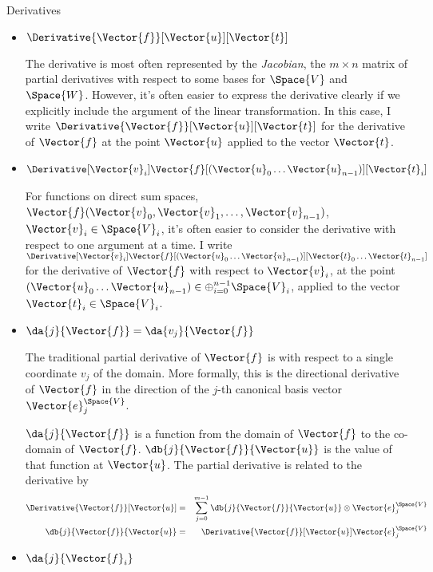 \begin{plSection}{Derivatives}
\begin{itemize}
\item $\Derivative{\Vector{f}}[\Vector{u}][\Vector{t}]$

The derivative is most often represented by the \textit{Jacobian},
the $m \times n$ matrix of partial derivatives
with respect to some bases for $\Space{V}$ and $\Space{W}$.
However, it's often easier to express the derivative clearly if we
explicitly include the argument of the linear transformation.
In this case, I write 
$\Derivative{\Vector{f}}[\Vector{u}][\Vector{t}]$
for the derivative of $\Vector{f}$ at the point $\Vector{u}$
applied to the vector $\Vector{t}$.

\item $\Derivative
[\Vector{v}_i]
{\Vector{f}}
[(\Vector{u}_0 \ldots \Vector{u}_{n-1})]
[\Vector{t}_i]$

For functions on direct sum spaces,
$\Vector{f}(\Vector{v}_0,\Vector{v}_1, \ldots, \Vector{v}_{n-1})$, $\Vector{v}_i \in \Space{V}_i$,
it's often easier to consider the derivative
with respect to one argument at a time.
I write 
$\Derivative[\Vector{v}_i]{\Vector{f}}
[(\Vector{u}_0 \ldots \Vector{u}_{n-1})]
[\Vector{t}_0 \ldots \Vector{t}_{n-1}]$
for the derivative of $\Vector{f}$ with respect to $\Vector{v}_i$,
at the point $(\Vector{u}_0 \ldots \Vector{u}_{n-1}) \in \oplus_{i=0}^{n-1} \Space{V}_i$,
applied to the vector $\Vector{t}_i \in \Space{V}_i$.

\item $\da{j}{\Vector{f}} = \da{v_j}{\Vector{f}}$

The traditional partial derivative of $\Vector{f}$ is with respect to
a single coordinate $v_j$ of the domain.
More formally, this is the directional derivative of $\Vector{f}$
in the direction of the $j$-th canonical basis vector $\Vector{e}_j^{\Space{V}}$.

$\da{j}{\Vector{f}}$ is a function from the domain of $\Vector{f}$ to the co-domain of $\Vector{f}$.
$\db{j}{\Vector{f}}{\Vector{u}}$ is the value of that function at $\Vector{u}$.
The partial derivative is related to the derivative by
\begin{eqnarray}
\label{eq:partial-full-dervatives}
\Derivative{\Vector{f}}[\Vector{u}]
& = &
\sum_{j=0}^{m-1} \db{j}{\Vector{f}}{\Vector{u}} \otimes \Vector{e}_j^{\Space{V}}
\\
\db{j}{\Vector{f}}{\Vector{u}}
& = &
\Derivative{\Vector{f}}[\Vector{u}] \Vector{e}_j^{\Space{V}}
\nonumber
\end{eqnarray}

\item $\da{j}{\Vector{f}_i}$


\end{itemize}
\end{plSection}
